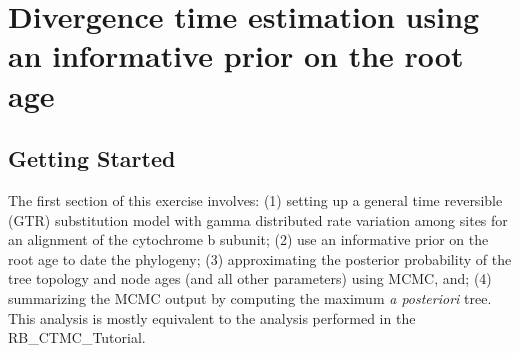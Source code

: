 \begin{table}[tbh!]
\centering
\caption{Calibration intervals used in \cite{Springer2012} to calibrate nodes in the primate tree.}\label{tab:calibration_springer}
\end{table}



\newpage
\FloatBarrier
\section{Divergence time estimation using an informative prior on the root age}\label{sec:RootCalibration}

\bigskip
\subsection{Getting Started}



The first section of this exercise involves:
(1) setting up a general time reversible (GTR) substitution model \citep{Tavare1986} with gamma distributed rate variation among sites \citep{Yang1994a} for an alignment of the cytochrome b subunit;
(2) use an informative prior on the root age to date the phylogeny;
(3) approximating the posterior probability of the tree topology and node ages (and all other parameters) using MCMC, and; 
(4) summarizing the MCMC output by computing the maximum \textit{a posteriori} tree. 
This analysis is mostly equivalent to the analysis performed in the RB\_CTMC\_Tutorial.

